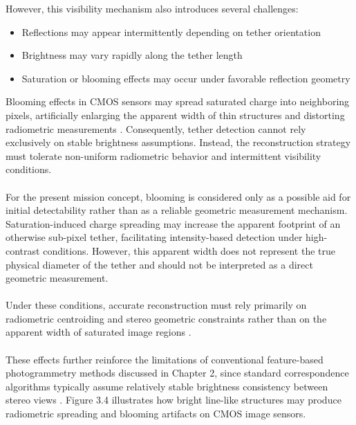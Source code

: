 However, this visibility mechanism also introduces several challenges:

\begin{itemize}
    \item Reflections may appear intermittently depending on tether orientation
    \item Brightness may vary rapidly along the tether length
    \item Saturation or blooming effects may occur under favorable reflection geometry \cite{ailuri2016blooming, chao2013blooming}
\end{itemize}

Blooming effects in CMOS sensors may spread saturated charge into neighboring pixels, artificially enlarging the apparent width of thin structures and distorting radiometric measurements \cite{ailuri2016blooming}. Consequently, tether detection cannot rely exclusively on stable brightness assumptions. Instead, the reconstruction strategy must tolerate non-uniform radiometric behavior and intermittent visibility conditions.
\\\\
For the present mission concept, blooming is considered only as a possible aid for initial detectability rather than as a reliable geometric measurement mechanism. Saturation-induced charge spreading may increase the apparent footprint of an otherwise sub-pixel tether, facilitating intensity-based detection under high-contrast conditions. However, this apparent width does not represent the true physical diameter of the tether and should not be interpreted as a direct geometric measurement.
\\\\
Under these conditions, accurate reconstruction must rely primarily on radiometric centroiding and stereo geometric constraints rather than on the apparent width of saturated image regions \cite{chao2013blooming, ailuri2016blooming}.
\\\\
These effects further reinforce the limitations of conventional feature-based photogrammetry methods discussed in Chapter 2, since standard correspondence algorithms typically assume relatively stable brightness consistency between stereo views \cite{kniaz2020wire, yu2023bonding}. Figure 3.4 illustrates how bright line-like structures may produce radiometric spreading and blooming artifacts on CMOS image sensors.

